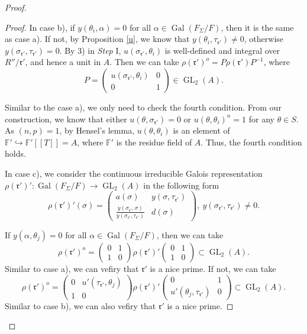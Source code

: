 \documentclass[12pt]{amsart}
\theoremstyle{plain}
\theoremstyle{definition}
\theoremstyle{remark}
\begin{document}
\begin{proof}
\begin{proof}
		In case b), if $y(\theta_{i}, \alpha)=0$ for all $\alpha \in \operatorname{Gal}(F_\Sigma/F)$, then it is the same as case a). If not, by Proposition \ref{u}, we know that $y(\theta_{i}, \tau_{\mathfrak{r}'}) \ne  0$, otherwise $y(\sigma_{\mathfrak{r}'}, \tau_{\mathfrak{r}'}) = 0$. By 3) in \textit{Step} I, $u(\sigma_{\mathfrak{r}'}, \theta_{i})$ is well-defined and integral over $R''/\mathfrak{r}'$, and hence a unit in $A$. Then we can take $\rho(\mathfrak{r}')^o=P\rho(\mathfrak{r}')P^{-1}$, where $$P= \begin{pmatrix}
			u(\sigma_{\mathfrak{r}'}, \theta_{i}) & 0\\
			0 & 1
		\end{pmatrix} \in \operatorname{GL}_2(A).$$
		
		Similar to the case a), we only need to check the fourth condition. From our construction, we know that either $u(\theta, \sigma_{\mathfrak{r}'})=0$ or $u(\theta, \theta_i)^{n}=1$ for any $\theta \in S$. As $(n,p)=1$, by Hensel's lemma, $ u(\theta, \theta_{i})$ is an element of $\mathbb{F}' \hookrightarrow \mathbb{F}'[[T]]=A$, where $\mathbb{F}' $ is the residue field of $A$. Thus, the fourth condition holds.
		
		In case c), we consider the continuous irreducible Galois representation $\rho(\mathfrak{r}')' : \operatorname{Gal}(F_{\Sigma}/F) \to \operatorname{GL}_2(A)$ in the following form $$
		\rho(\mathfrak{r}')'(\sigma)=\begin{pmatrix}
			a(\sigma) & y(\sigma, \tau_{\mathfrak{r}'})\\
			\frac{y(\sigma_{\mathfrak{r}'}, \sigma)}{y(\sigma_{\mathfrak{r}'}, \tau_{\mathfrak{r}'})}& d(\sigma)
		\end{pmatrix}, ~y(\sigma_{\mathfrak{r}'}, \tau_{\mathfrak{r}'}) \ne 0.$$
		
		If $y(\alpha, \theta_j)=0$ for all $\alpha \in \operatorname{Gal}(F_\Sigma/F)$, then we can take $$
		\rho(\mathfrak{r}')^o=\begin{pmatrix}
			0 & 1\\
			1 & 0
		\end{pmatrix} \rho(\mathfrak{r}')'\begin{pmatrix}
		0 & 1\\
		1 & 0
		\end{pmatrix} \subset \operatorname{GL}_2(A). $$
		Similar to case a), we can vefiry that $\mathfrak{r}'$ is a nice prime.
		If not, we can take $$ \rho(\mathfrak{r}')^o=\begin{pmatrix}
			0 & u'(\tau_{\mathfrak{r}'}, \theta_{j})\\
			1 & 0
		\end{pmatrix} \rho(\mathfrak{r}')'\begin{pmatrix}
			0 & 1\\
			u'(\theta_{j}, \tau_{\mathfrak{r}'}) & 0
		\end{pmatrix} \subset \operatorname{GL}_2(A). $$
	Similar to case b), we can also vefiry that $\mathfrak{r}'$ is a nice prime.
	\end{proof}
	

\end{proof}
\end{document}
